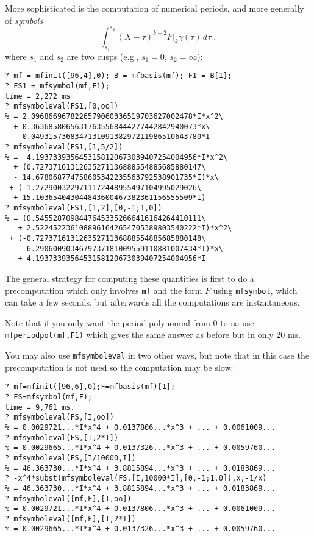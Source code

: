 \documentclass[11pt]{article}
\newcommand{\ga}{\gamma}
\def\kbd#1{{\tt #1}}
\begin{document}
  More sophisticated is the computation of numerical periods, and more
  generally of \emph{symbols}
  $$\int_{s_1}^{s_2}(X-\tau)^{k-2}F|_k\ga(\tau)\,d\tau\;,$$
  where $s_1$ and $s_2$ are two cusps (e.g., $s_1=0$, $s_2=\infty$):

\begin{verbatim}
? mf = mfinit([96,4],0); B = mfbasis(mf); F1 = B[1];
? FS1 = mfsymbol(mf,F1);
time = 2,272 ms
? mfsymboleval(FS1,[0,oo])
% = 2.0968669678226579060336519703627002478*I*x^2\
  + 0.36368580656317635568444277442842940073*x\
  - 0.049315736834713109138297211986510643780*I
? mfsymboleval(FS1,[1,5/2])
% =  4.1937339356453158120673039407254004956*I*x^2\
  + (0.72737161312635271136888554885685880147\
  - 14.678068774758605342235563792538901735*I)*x\
 + (-1.2729003229711172448955497104995029026\
  + 15.103654043044843600467382361156555509*I)
? mfsymboleval(FS1,[1,2],[0,-1;1,0])
% = (0.54552870984476453352666416164264410111\
   + 2.5224522361088961642654705389803540222*I)*x^2\
 + (-0.72737161312635271136888554885685880148\
   - 6.2906009034679737181009559110881007434*I)*x\
   + 4.1937339356453158120673039407254004956*I
\end{verbatim}

The general strategy for computing these quantities is first to do a
precomputation which only involves \kbd{mf} and the form $F$ using
\kbd{mfsymbol}, which can take a few seconds, but afterwards all the
computations are instantaneous.

Note that if you only want the period polynomial from $0$ to
$\infty$ use \kbd{mfperiodpol(mf,F1)} which gives the same answer as before
but in only $20$ ms.

You may also use \kbd{mfsymboleval} in two other ways, but note that in
this case the precomputation is not used so the computation may be slow:

\begin{verbatim}
? mf=mfinit([96,6],0);F=mfbasis(mf)[1];
? FS=mfsymbol(mf,F);
time = 9,761 ms.
? mfsymboleval(FS,[I,oo])
% = 0.0029721...*I*x^4 + 0.0137806...*x^3 + ... + 0.0061009...
? mfsymboleval(FS,[I,2*I])
% = 0.0029665...*I*x^4 + 0.0137326...*x^3 + ... + 0.0059760...
? mfsymboleval(FS,[I/10000,I])
% = 46.363730...*I*x^4 + 3.8815894...*x^3 + ... + 0.0183869...
? -x^4*subst(mfsymboleval(FS,[I,10000*I],[0,-1;1,0]),x,-1/x)
% = 46.363730...*I*x^4 + 3.8815894...*x^3 + ... + 0.0183869...
? mfsymboleval([mf,F],[I,oo])
% = 0.0029721...*I*x^4 + 0.0137806...*x^3 + ... + 0.0061009...
? mfsymboleval([mf,F],[I,2*I])
% = 0.0029665...*I*x^4 + 0.0137326...*x^3 + ... + 0.0059760...
\end{verbatim}
\end{document}
